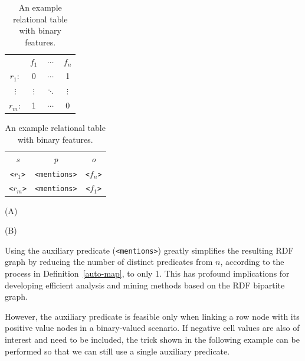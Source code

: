 \begin{table}[ht]
\begin{minipage}[b]{0.38\linewidth}\begin{flushright}
\begin{tabular}{ c | c | c | c |}
\cline{2-4}
	~   & $f_1$	    & $\cdots$  & $f_n$   \\
\cline{2-4}
$r_1:$	&  0  	& $\cdots$   &    1  \\
\cline{2-4}
$\vdots$& $\vdots$  & $\ddots$  & $\vdots$\\
\cline{2-4}
$r_m:$	&  1  	& $\cdots$   &    0  \\
\cline{2-4}
\end{tabular}
\end{flushright}
\end{minipage}
\hfill
\begin{minipage}[b]{0.4\linewidth}
\begin{tabular}{c c c}
\emph{s}&   \emph{p}&  \emph{o}\\
\texttt{<$r_1$>}   &    \texttt{<mentions>}   &  \texttt{<$f_n$>}\\
\texttt{<$r_m$>}   &    \texttt{<mentions>}   &  \texttt{<$f_1$>}\\
\end{tabular}
\end{minipage}
\begin{minipage}[c]{0.4\linewidth}\centering
\vspace{0.2cm}\hspace{2.8cm}(A)
\end{minipage}
\begin{minipage}[c]{0.4\linewidth}\centering
\vspace{0.2cm}\hspace{3.5cm}(B)
\end{minipage}
\caption{\label{tbl:binary-rel} An example relational table with binary features.}
\end{table}

Using the auxiliary predicate (\texttt{<mentions>}) greatly simplifies the resulting RDF graph by reducing the number of distinct predicates from $n$, according to the process in Definition~\ref{auto-map}, to only 1. This has profound implications for developing efficient analysis and mining methods based on the RDF bipartite graph.

However, the auxiliary predicate is feasible only when linking a row node with its positive value nodes in a binary-valued scenario. If negative cell values are also of interest and need to be included, the trick shown in the following example can be performed so that we can still use a single auxiliary predicate.

